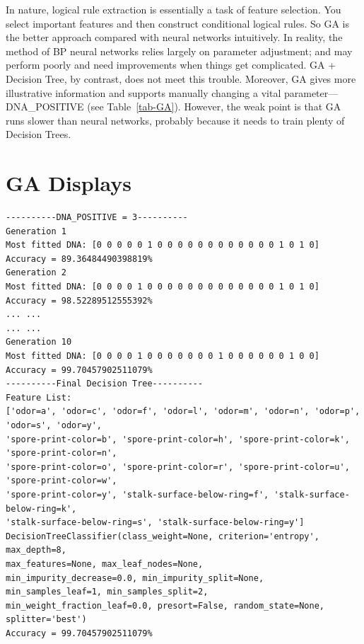 \documentclass[runningheads]{llncs}
\begin{document}
In nature, logical rule extraction is essentially a task of feature selection. You select important features and then construct conditional logical rules. So GA is the better approach compared with neural networks intuitively. In reality, the method of BP neural networks relies largely on parameter adjustment; and may perform poorly and need improvements when things get complicated. GA + Decision Tree, by contrast, does not meet this trouble. Moreover, GA gives more illustrative information and supports manually changing a vital parameter---DNA\_POSITIVE (see Table~\ref{tab-GA}). However, the weak point is that GA runs slower than neural networks, probably because it needs to train plenty of Decision Trees.

\appendix
\section{GA Displays}
\begin{verbatim}
----------DNA_POSITIVE = 3----------
Generation 1
Most fitted DNA: [0 0 0 0 0 1 0 0 0 0 0 0 0 0 0 0 0 0 1 0 1 0]
Accuracy = 89.36484490398819%
Generation 2
Most fitted DNA: [0 0 0 0 1 0 0 0 0 0 0 0 0 0 0 0 0 0 1 0 1 0]
Accuracy = 98.52289512555392%
... ...
... ...
Generation 10
Most fitted DNA: [0 0 0 0 1 0 0 0 0 0 0 0 1 0 0 0 0 0 0 1 0 0]
Accuracy = 99.70457902511079%
----------Final Decision Tree----------
Feature List:
['odor=a', 'odor=c', 'odor=f', 'odor=l', 'odor=m', 'odor=n', 'odor=p', 'odor=s', 'odor=y',
'spore-print-color=b', 'spore-print-color=h', 'spore-print-color=k', 'spore-print-color=n',
'spore-print-color=o', 'spore-print-color=r', 'spore-print-color=u', 'spore-print-color=w',
'spore-print-color=y', 'stalk-surface-below-ring=f', 'stalk-surface-below-ring=k',
'stalk-surface-below-ring=s', 'stalk-surface-below-ring=y']
DecisionTreeClassifier(class_weight=None, criterion='entropy', max_depth=8,
max_features=None, max_leaf_nodes=None,
min_impurity_decrease=0.0, min_impurity_split=None,
min_samples_leaf=1, min_samples_split=2,
min_weight_fraction_leaf=0.0, presort=False, random_state=None,
splitter='best')
Accuracy = 99.70457902511079%
\end{verbatim}
\end{document}
